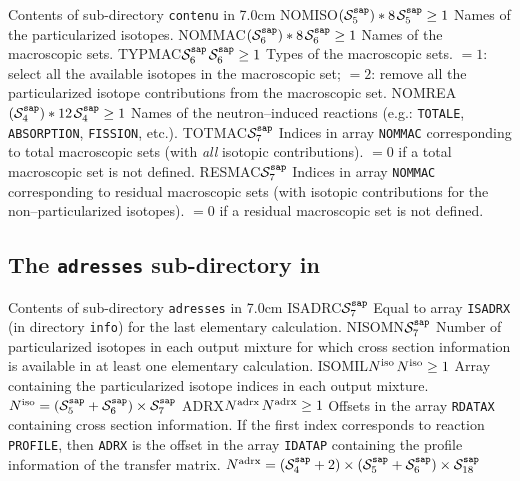 \begin{DescriptionEnregistrement}{Contents of sub-directory {\tt contenu} in }{7.0cm}
\OptCharEnr
  {NOMISO}{$(\mathcal{S}^{\tt sap}_5)*8$}{$\mathcal{S}^{\tt sap}_5\ge 1$}
  {Names of the particularized isotopes.}
\OptCharEnr
  {NOMMAC}{$(\mathcal{S}^{\tt sap}_6)*8$}{$\mathcal{S}^{\tt sap}_6\ge 1$}
  {Names of the macroscopic sets.}
\OptIntEnr
  {TYPMAC}{$\mathcal{S}^{\tt sap}_6$}{$\mathcal{S}^{\tt sap}_6\ge 1$}
  {Types of the macroscopic sets. $=1$: select all the available isotopes in the macroscopic set;
  $=2$: remove all the particularized isotope contributions from the macroscopic set.}
\OptCharEnr
  {NOMREA}{$(\mathcal{S}^{\tt sap}_4)*12$}{$\mathcal{S}^{\tt sap}_4\ge 1$}
  {Names of the neutron--induced reactions (e.g.: {\tt TOTALE}, {\tt ABSORPTION}, {\tt FISSION}, etc.).}
\IntEnr
  {TOTMAC}{$\mathcal{S}^{\tt sap}_7$}
  {Indices in array {\tt NOMMAC} corresponding to total macroscopic sets (with {\sl all}
  isotopic contributions). $=0$ if a total macroscopic set is not defined.}
\IntEnr
  {RESMAC}{$\mathcal{S}^{\tt sap}_7$}
  {Indices in array {\tt NOMMAC} corresponding to residual macroscopic sets (with isotopic
  contributions for the non--particularized isotopes). $=0$ if a residual macroscopic set is not defined.}
\end{DescriptionEnregistrement}

\newpage
\subsection{The {\tt adresses} sub-directory in }\label{sect:sapdirad}

\vskip -0.5cm

\begin{DescriptionEnregistrement}{Contents of sub-directory {\tt adresses} in }{7.0cm}
\IntEnr
  {ISADRC}{$\mathcal{S}^{\tt sap}_7$}
  {Equal to array {\tt ISADRX} (in directory {\tt info}) for the last elementary calculation.}
\IntEnr
  {NISOMN}{$\mathcal{S}^{\tt sap}_7$}
  {Number of particularized isotopes in each output mixture for which cross section information
  is available in at least one elementary calculation.}
\OptIntEnr
  {ISOMIL}{$N^{\rm iso}$}{$N^{\rm iso}\ge 1$}
  {Array containing the particularized isotope indices in each output mixture.
  \hbox{$N^{\rm iso}=(\mathcal{S}^{\tt sap}_5+\mathcal{S}^{\tt sap}_6) \times \mathcal{S}^{\tt sap}_7$}}
\OptIntEnr
  {ADRX}{$N^{\rm adrx}$}{$N^{\rm adrx}\ge 1$}
  {Offsets in the array {\tt RDATAX} containing cross
  section information. If the first index corresponds to reaction {\tt PROFILE}, then {\tt ADRX}
  is the offset in the array {\tt IDATAP} containing
  the profile information of the transfer matrix.
  \hbox{$N^{\rm adrx}=(\mathcal{S}^{\tt sap}_4+2)\times(\mathcal{S}^{\tt sap}_5+\mathcal{S}^{\tt sap}_6)
  \times \mathcal{S}^{\tt sap}_{18}$}}
\end{DescriptionEnregistrement}

